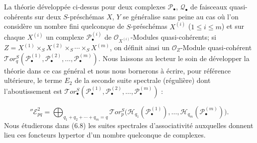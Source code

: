 \begin{env}[6.5.15]
La théorie développée ci-dessus pour deux complexes $\mathscr P_\bullet$,
$\mathscr Q_\bullet$ de faisceaux quasi-cohérents sur deux $S$-préschémas
$X$, $Y$ se généralise sans peine au cas où l'on considère un nombre fini
quelconque de $S$-préschémas $X^{(i)}$ ($1\leqslant i\leqslant m$) et sur
chaque $X^{(i)}$ un complexe $\mathscr P_\bullet^{(i)}$ de
$\mathscr O_{X^{(i)}}$-Modules quasi-cohérents; si
$Z=X^{(1)}\times_S X^{(2)}\times_S\cdots\times_S X^{(m)}$, on définit ainsi un
$\mathscr O_Z$-Module quasi-cohérent
$\mathscr{T}\!or_q^S(\mathscr P_\bullet^{(1)},\mathscr P_\bullet^{(2)},
\ldots,\mathscr P_\bullet^{(m)})$. Nous laissons au lecteur le soin de
développer la théorie dans ce cas général et nous nous bornerons à écrire,
pour référence ultérieure, le terme $E_2$ de la seconde suite spectrale
(régulière) dont l'aboutissement est
$\mathscr{T}\!or_\bullet^S(\mathscr P_\bullet^{(1)},
\mathscr P_\bullet^{(2)},\ldots,\mathscr P_\bullet^{(m)})$ :


\[
  ''\mathscr E_{pq}^2
  =\bigoplus_{q_1+q_2+\cdots+q_m=q}
   \mathscr{T}\!or_p^S
   \bigl(\mathscr H_{q_1}(\mathscr P_\bullet^{(1)}),\ldots,
         \mathscr H_{q_m}(\mathscr P_\bullet^{(m)})\bigr).
  \tag{6.5.15.1}\label{III.6.5.15.1.fr}
\]
Nous étudierons dans (6.8) les suites spectrales d'associativité auxquelles
donnent lieu ces foncteurs hypertor d'un nombre quelconque de complexes.
\end{env}

